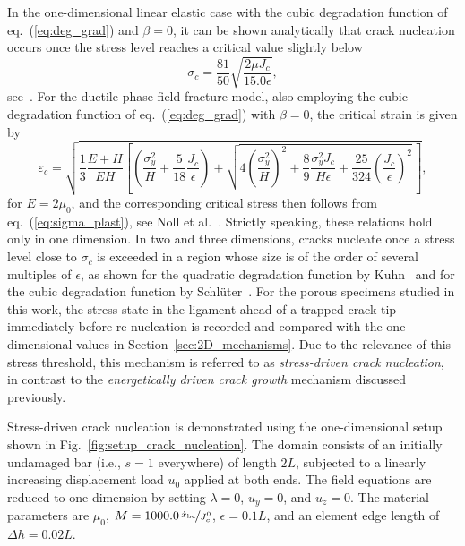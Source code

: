 \documentclass[pdflatex,sn-mathphys-num]{sn-jnl}%
\theoremstyle{thmstyleone}%
\theoremstyle{thmstyletwo}%
\theoremstyle{thmstylethree}%
\begin{document}
In the one-dimensional linear elastic case with the cubic degradation function of eq.~(\ref{eq:deg_grad}) and $\beta = 0$, it can be shown analytically that crack nucleation occurs once the stress level reaches a critical value slightly below
\begin{equation}
    \sigma_c = \dfrac{81}{50}\sqrt{\dfrac{2\mu J_c}{15.0\epsilon}},
    \label{eq:sig_c}
\end{equation}
see~\cite{schlueter_phase_2018}. For the ductile phase-field fracture model, also employing the cubic degradation function of eq.~(\ref{eq:deg_grad}) with $\beta = 0$, the critical strain is given by
\begin{equation}
    \varepsilon_c = \sqrt{\dfrac{1}{3} \dfrac{E+H}{EH}
    \left[\left(\dfrac{\sigma_y^2}{H} + \dfrac{5}{18}\dfrac{J_c}{\epsilon}\right)
    + \sqrt{4\left(\dfrac{\sigma_y^2}{H}\right)^2
    + \dfrac{8}{9} \dfrac{\sigma_y^2 J_c}{H\epsilon}
    + \dfrac{25}{324} \left(\dfrac{J_c}{\epsilon}\right)^2}\,\right]},
    \label{eq:ductile_fracture_strain}
\end{equation}
for $E = 2\mu_0$, and the corresponding critical stress then follows from eq.~(\ref{eq:sigma_plast}), see Noll et al.~\cite{noll_3d_2020}. Strictly speaking, these relations hold only in one dimension. In two and three dimensions, cracks nucleate once a stress level close to $\sigma_c$ is exceeded in a region whose size is of the order of several multiples of $\epsilon$, as shown for the quadratic degradation function by Kuhn~\cite{kuhn_numerical_2013} and for the cubic degradation function by Schl\"uter~\cite{schlueter_phase_2018}. For the porous specimens studied in this work, the stress state in the ligament ahead of a trapped crack tip immediately before re-nucleation is recorded and compared with the one-dimensional values in Section~\ref{sec:2D_mechanisms}. Due to the relevance of this stress threshold, this mechanism is referred to as \textsl{stress-driven crack nucleation}, in contrast to the \textsl{energetically driven crack growth} mechanism discussed previously.

Stress-driven crack nucleation is demonstrated using the one-dimensional setup shown in Fig.~\ref{fig:setup_crack_nucleation}. The domain consists of an initially undamaged bar (i.e., $s = 1$ everywhere) of length $2L$, subjected to a linearly increasing displacement load $u_0$ applied at both ends. The field equations are reduced to one dimension by setting $\lambda = 0$, $u_y = 0$, and $u_z = 0$. The material parameters are $\mu_0$, $M = 1000.0\,\nicefrac{\dot{x}_{\text{bc}}}{J_c^0}$, $\epsilon = 0.1L$, and an element edge length of $\Delta h = 0.02L$.
\end{document}
